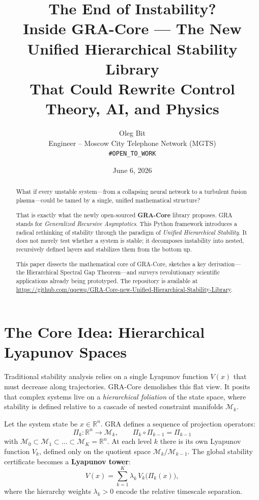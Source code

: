 \documentclass[11pt,a4paper]{article}
\title{\textbf{The End of Instability?}\\
\large Inside GRA-Core --- The New Unified Hierarchical Stability Library\\
That Could Rewrite Control Theory, AI, and Physics}
\author{Oleg Bit\\
\small Engineer -- Moscow City Telephone Network (MGTS)\\
\small \texttt{\#OPEN\_TO\_WORK}}
\date{June 6, 2026}
\begin{document}
\maketitle

\begin{abstract}
What if every unstable system---from a collapsing neural network to a turbulent fusion plasma---could be tamed by a single, unified mathematical structure?

That is exactly what the newly open-sourced \textbf{GRA-Core} library proposes. GRA stands for \emph{Generalized Recursive Asymptotics}. This Python framework introduces a radical rethinking of stability through the paradigm of \emph{Unified Hierarchical Stability}. It does not merely test whether a system is stable; it decomposes instability into nested, recursively defined layers and stabilizes them from the bottom up.

This paper dissects the mathematical core of GRA-Core, sketches a key derivation---the Hierarchical Spectral Gap Theorem---and surveys revolutionary scientific applications already being prototyped. The repository is available at \url{https://github.com/qqewq/GRA-Core-new-Unified-Hierarchical-Stability-Library}.
\end{abstract}

\section{The Core Idea: Hierarchical Lyapunov Spaces}
Traditional stability analysis relies on a single Lyapunov function $V(x)$ that must decrease along trajectories. GRA-Core demolishes this flat view. It posits that complex systems live on a \emph{hierarchical foliation} of the state space, where stability is defined relative to a cascade of nested constraint manifolds $\mathcal{M}_k$.

Let the system state be $x \in \mathbb{R}^n$. GRA defines a sequence of projection operators:
\begin{equation}
\Pi_k : \mathbb{R}^n \to \mathcal{M}_k, \qquad \Pi_k \circ \Pi_{k-1} = \Pi_{k-1}
\end{equation}
with $\mathcal{M}_0 \subset \mathcal{M}_1 \subset \dots \subset \mathcal{M}_K = \mathbb{R}^n$. At each level $k$ there is its own Lyapunov function $V_k$, defined only on the quotient space $\mathcal{M}_k / \mathcal{M}_{k-1}$. The global stability certificate becomes a \textbf{Lyapunov tower}:
\begin{equation}
V(x) = \sum_{k=1}^{K} \lambda_k \, V_k\bigl(\Pi_k(x)\bigr),
\end{equation}
where the hierarchy weights $\lambda_k > 0$ encode the relative timescale separation.
\end{document}
